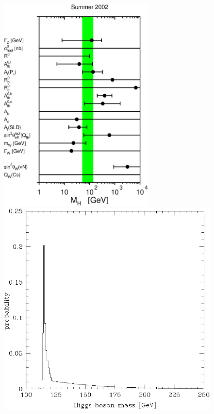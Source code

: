 \begin{slide*}

\slideframe{}

\begin{center}
  \vfill
  \includegraphics[height=11cm,angle=-90]{s02_show_higgs.eps} \\
  \vfill
  \includegraphics[height=11cm,angle=-90]{mass_pdf.eps}
  \vfill
\end{center}

\end{slide*}

